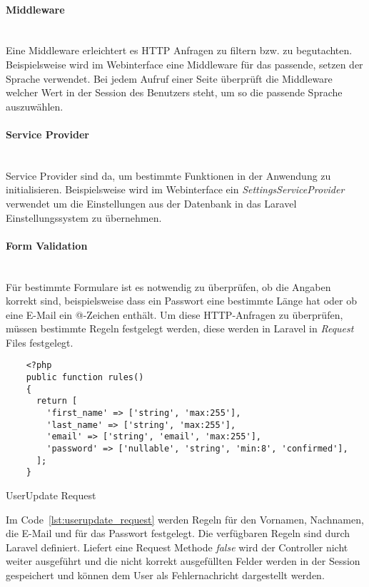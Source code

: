 \paragraph{Middleware}\mbox{}\\
Eine Middleware erleichtert es HTTP Anfragen zu filtern bzw. zu begutachten.
Beispielsweise wird im Webinterface eine Middleware für das passende, setzen der
Sprache verwendet. Bei jedem Aufruf einer Seite überprüft die Middleware welcher
Wert in der Session des Benutzers steht, um so die passende Sprache auszuwählen.

\paragraph{Service Provider}\mbox{}\\
Service Provider sind da, um bestimmte Funktionen in der Anwendung zu
initialisieren. Beispielsweise wird im Webinterface ein
\textit{SettingsServiceProvider} verwendet um die Einstellungen aus der Datenbank
in das Laravel Einstellungssystem zu übernehmen.

\paragraph{Form Validation}\mbox{}\\
Für bestimmte Formulare ist es notwendig zu überprüfen, ob die Angaben korrekt
sind, beispielsweise dass ein Passwort eine bestimmte Länge hat oder ob eine
E-Mail ein @-Zeichen enthält. Um diese HTTP-Anfragen zu überprüfen, müssen bestimmte Regeln
festgelegt werden, diese werden in Laravel in \textit{Request} Files festgelegt.

\begin{listing}[H]
  \begin{verbatim}
    <?php
    public function rules()
    {
      return [
        'first_name' => ['string', 'max:255'],
        'last_name' => ['string', 'max:255'],
        'email' => ['string', 'email', 'max:255'],
        'password' => ['nullable', 'string', 'min:8', 'confirmed'],
      ];
    }
  \end{verbatim}
  \caption{UserUpdate Request}
  \label{lst:userupdate_request}
\end{listing}

Im Code~\ref{lst:userupdate_request} werden Regeln für den Vornamen, Nachnamen,
die E-Mail und für das Passwort festgelegt. Die verfügbaren Regeln sind durch
Laravel definiert. Liefert eine Request Methode \textit{false} wird der
Controller nicht weiter ausgeführt und die nicht korrekt ausgefüllten Felder
werden in der Session gespeichert und können dem User als Fehlernachricht
dargestellt werden.

